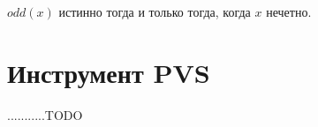 \documentclass[14pt, twoside]{extreport}
\begin{document}
$odd(x)$ истинно тогда и только тогда, когда $x$ нечетно.




\section{Инструмент PVS}
...........TODO




\end{document}
